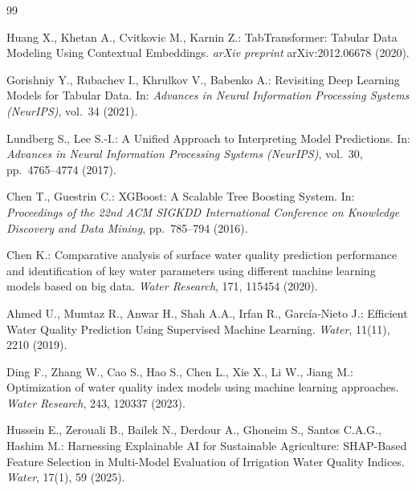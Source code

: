 \documentclass[12pt,a4paper]{report}
\numberwithin{table}{chapter}
\numberwithin{figure}{chapter}
\begin{document}
\newpage
{}
\label{sec:references}
\renewcommand{\bibname}{REFERENCES}
\begin{thebibliography}{99}

Huang X., Khetan A., Cvitkovic M., Karnin Z.:
TabTransformer: Tabular Data Modeling Using Contextual Embeddings.
\textit{arXiv preprint} arXiv:2012.06678 (2020).

Gorishniy Y., Rubachev I., Khrulkov V., Babenko A.:
Revisiting Deep Learning Models for Tabular Data.
In: \textit{Advances in Neural Information Processing Systems (NeurIPS)}, vol.~34 (2021).

Lundberg S., Lee S.-I.:
A Unified Approach to Interpreting Model Predictions.
In: \textit{Advances in Neural Information Processing Systems (NeurIPS)}, vol.~30, pp.~4765--4774 (2017).

Chen T., Guestrin C.:
XGBoost: A Scalable Tree Boosting System.
In: \textit{Proceedings of the 22nd ACM SIGKDD International Conference on Knowledge Discovery and Data Mining}, pp.~785--794 (2016).

Chen K.:
Comparative analysis of surface water quality prediction performance and identification of key water parameters using different machine learning models based on big data.
\textit{Water Research}, 171, 115454 (2020).

Ahmed U., Mumtaz R., Anwar H., Shah A.A., Irfan R., Garc{\'i}a-Nieto J.:
Efficient Water Quality Prediction Using Supervised Machine Learning.
\textit{Water}, 11(11), 2210 (2019).

Ding F., Zhang W., Cao S., Hao S., Chen L., Xie X., Li W., Jiang M.:
Optimization of water quality index models using machine learning approaches.
\textit{Water Research}, 243, 120337 (2023).

Hussein E., Zerouali B., Bailek N., Derdour A., Ghoneim S., Santos C.A.G., Hashim M.:
Harnessing Explainable AI for Sustainable Agriculture: SHAP-Based Feature Selection in Multi-Model Evaluation of Irrigation Water Quality Indices.
\textit{Water}, 17(1), 59 (2025).


\end{thebibliography}
\end{document}
